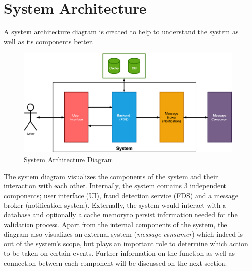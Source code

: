 \section{System Architecture}

A system architecture diagram is created to help to understand the system as well as its components better. 

\begin{figure}[h]
 \includegraphics[width=\textwidth]{diagrams/system.png}
 \caption{System Architecture Diagram}
\end{figure}
 
The system diagram visualizes the components of the system and their interaction with each other. Internally, the system contains 3 independent components; user interface (UI), fraud detection service (FDS) and a message broker (notification system). 
Externally, the system would interact with a database and optionally a cache memory\footnotemark  to persist information needed for the validation process. Apart from the internal components of the system, the diagram also visualizes an external system (\emph{message consumer}) which indeed is out of the system's scope, but plays an important role to determine which action to be taken on certain events. Further information on the function as well as connection between each component will be discussed on the next section.

